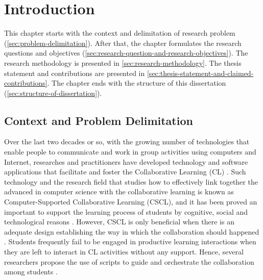 \chapter{Introduction}
\label{chapter:introducao}

This chapter starts with the context and delimitation of research problem (\autoref{sec:problem-delimitation}). After that, the chapter formulates the research questions and objectives (\autoref{sec:research-question-and-research-objectives}). The research methodology is presented in \autoref{sec:research-methodology}. The thesis statement and contributions are presented in \autoref{sec:thesis-statement-and-claimed-contributions}. The chapter ends with the structure of this dissertation (\autoref{sec:structure-of-dissertation}).

\section{Context and Problem Delimitation}
\label{sec:problem-delimitation}

Over the last two decades or so, with the growing number of technologies that enable people to communicate and work in group activities using computers and Internet, researches and practitioners have developed technology and software applications that facilitate and foster the Collaborative Learning (CL) \cite{LehtinenHakkarainenLipponenRahikainenMuukkonen1999}. Such technology and the research field that studies how to effectively link together the advanced in computer science with the collaborative learning is known as Computer-Supported Collaborative Learning (CSCL), and it has been proved an important to support the learning process of students by cognitive, social and technological reasons \cite{StahlKoschmannSuthers2006}. However, CSCL is only beneficial when there is an adequate design establishing the way in which the collaboration should happened \cite{Dillenbourg2013, Hewitt2005, IsotaniInabaIkedaMizoguchi2009}. Students frequently fail to be engaged in productive learning interactions when they are left to interact in CL activities without any support. Hence, several researchers propose the use of scripts to guide and orchestrate the collaboration among students \cite{AlharbiAthaudaChiong2014}.

